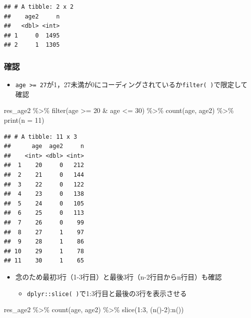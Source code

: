 \documentclass[
  xelatex,ja=standard, b5paper]{bxjsbook}
\newenvironment{Shaded}{\begin{snugshade}}{\end{snugshade}}
\newcommand{\AttributeTok}[1]{\textcolor[rgb]{0.77,0.63,0.00}{#1}}
\newcommand{\DecValTok}[1]{\textcolor[rgb]{0.00,0.00,0.81}{#1}}
\newcommand{\FunctionTok}[1]{\textcolor[rgb]{0.00,0.00,0.00}{#1}}
\newcommand{\NormalTok}[1]{#1}
\newcommand{\SpecialCharTok}[1]{\textcolor[rgb]{0.00,0.00,0.00}{#1}}
\providecommand{\tightlist}{%
  \setlength{\itemsep}{0pt}\setlength{\parskip}{0pt}}
\begin{document}
\begin{verbatim}
## # A tibble: 2 x 2
##    age2     n
##   <dbl> <int>
## 1     0  1495
## 2     1  1305
\end{verbatim}

\hypertarget{ux78baux8a8d-1}{%
\subsubsection{確認}\label{ux78baux8a8d-1}}

\begin{itemize}
\tightlist
\item
  \texttt{age\ \textgreater{}=\ 27}が1，27未満が0にコーディングされているか\texttt{filter(\ )}で限定して確認
\end{itemize}

\begin{Shaded}
\begin{Highlighting}[]
\NormalTok{res\_age2 }\SpecialCharTok{\%\textgreater{}\%} 
  \FunctionTok{filter}\NormalTok{(age }\SpecialCharTok{\textgreater{}=} \DecValTok{20} \SpecialCharTok{\&}\NormalTok{ age }\SpecialCharTok{\textless{}=} \DecValTok{30}\NormalTok{) }\SpecialCharTok{\%\textgreater{}\%} 
  \FunctionTok{count}\NormalTok{(age, age2) }\SpecialCharTok{\%\textgreater{}\%} 
  \FunctionTok{print}\NormalTok{(}\AttributeTok{n =} \DecValTok{11}\NormalTok{)}
\end{Highlighting}
\end{Shaded}

\begin{verbatim}
## # A tibble: 11 x 3
##      age  age2     n
##    <int> <dbl> <int>
##  1    20     0   212
##  2    21     0   144
##  3    22     0   122
##  4    23     0   138
##  5    24     0   105
##  6    25     0   113
##  7    26     0    99
##  8    27     1    97
##  9    28     1    86
## 10    29     1    78
## 11    30     1    65
\end{verbatim}

\begin{itemize}
\tightlist
\item
  念のため最初3行（1-3行目）と最後3行（n-2行目からn行目）も確認

  \begin{itemize}
  \tightlist
  \item
    \texttt{dplyr::slice(\ )}で1:3行目と最後の3行を表示させる
  \end{itemize}
\end{itemize}

\begin{Shaded}
\begin{Highlighting}[]
\NormalTok{res\_age2 }\SpecialCharTok{\%\textgreater{}\%} 
  \FunctionTok{count}\NormalTok{(age, age2) }\SpecialCharTok{\%\textgreater{}\%} 
  \FunctionTok{slice}\NormalTok{(}\DecValTok{1}\SpecialCharTok{:}\DecValTok{3}\NormalTok{, (}\FunctionTok{n}\NormalTok{()}\SpecialCharTok{{-}}\DecValTok{2}\NormalTok{)}\SpecialCharTok{:}\FunctionTok{n}\NormalTok{())}
\end{Highlighting}
\end{Shaded}
\end{document}
